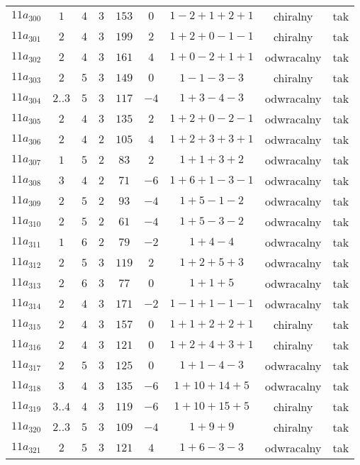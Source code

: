 \begin{longtable}{ccccccccc}
$11a_{300}$ & $1$ & $4$ & $3$ & $153$ & $0$ & $1-2+1+2+1$ & chiralny & tak \\
$11a_{301}$ & $2$ & $4$ & $3$ & $199$ & $2$ & $1+2+0-1-1$ & chiralny & tak \\
$11a_{302}$ & $2$ & $4$ & $3$ & $161$ & $4$ & $1+0-2+1+1$ & odwracalny & tak \\
$11a_{303}$ & $2$ & $5$ & $3$ & $149$ & $0$ & $1-1-3-3$ & chiralny & tak \\
$11a_{304}$ & $2..3$ & $5$ & $3$ & $117$ & $-4$ & $1+3-4-3$ & odwracalny & tak \\
$11a_{305}$ & $2$ & $4$ & $3$ & $135$ & $2$ & $1+2+0-2-1$ & odwracalny & tak \\
$11a_{306}$ & $2$ & $4$ & $2$ & $105$ & $4$ & $1+2+3+3+1$ & odwracalny & tak \\
$11a_{307}$ & $1$ & $5$ & $2$ & $83$ & $2$ & $1+1+3+2$ & odwracalny & tak \\
$11a_{308}$ & $3$ & $4$ & $2$ & $71$ & $-6$ & $1+6+1-3-1$ & odwracalny & tak \\
$11a_{309}$ & $2$ & $5$ & $2$ & $93$ & $-4$ & $1+5-1-2$ & odwracalny & tak \\
$11a_{310}$ & $2$ & $5$ & $2$ & $61$ & $-4$ & $1+5-3-2$ & odwracalny & tak \\
$11a_{311}$ & $1$ & $6$ & $2$ & $79$ & $-2$ & $1+4-4$ & odwracalny & tak \\
$11a_{312}$ & $2$ & $5$ & $3$ & $119$ & $2$ & $1+2+5+3$ & odwracalny & tak \\
$11a_{313}$ & $2$ & $6$ & $3$ & $77$ & $0$ & $1+1+5$ & odwracalny & tak \\
$11a_{314}$ & $2$ & $4$ & $3$ & $171$ & $-2$ & $1-1+1-1-1$ & odwracalny & tak \\
$11a_{315}$ & $2$ & $4$ & $3$ & $157$ & $0$ & $1+1+2+2+1$ & chiralny & tak \\
$11a_{316}$ & $2$ & $4$ & $3$ & $121$ & $0$ & $1+2+4+3+1$ & chiralny & tak \\
$11a_{317}$ & $2$ & $5$ & $3$ & $125$ & $0$ & $1+1-4-3$ & odwracalny & tak \\
$11a_{318}$ & $3$ & $4$ & $3$ & $135$ & $-6$ & $1+10+14+5$ & odwracalny & tak \\
$11a_{319}$ & $3..4$ & $4$ & $3$ & $119$ & $-6$ & $1+10+15+5$ & chiralny & tak \\
$11a_{320}$ & $2..3$ & $5$ & $3$ & $109$ & $-4$ & $1+9+9$ & chiralny & tak \\
$11a_{321}$ & $2$ & $5$ & $3$ & $121$ & $4$ & $1+6-3-3$ & odwracalny & tak \\

\end{longtable}
